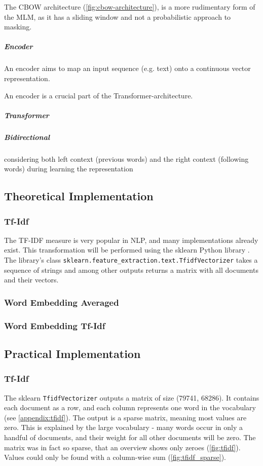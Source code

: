              The \ac{CBOW} architecture (\ref{fig:cbow-architecture}), is a more rudimentary form of the \ac{MLM}, as it has a sliding window and not a probabilistic approach to masking.
            
             \subparagraph{Encoder} An encoder aims to map an input sequence (e.g. text) onto a continuous vector representation.
             
             An encoder is a crucial part of the Transformer-architecture.
            
            \subparagraph{Transformer}
            \cite{transformersAttention}
            
            
            
            
           
            
            \subparagraph{Bidirectional}
            
            considering both left context (previous words) and the right context (following words) during learning the representation
            \subsection{Theoretical Implementation}
            \subsubsection{Tf-Idf}
            The \ac{TF-IDF} measure is very popular in \ac{NLP}, and many implementations already exist. This transformation will be performed using the \ac{sklearn} Python library \cite{sklearn}. The library's class \lstinline|sklearn.feature_extraction.text.TfidfVectorizer| takes a sequence of strings and among other outputs returns a matrix with all documents and their vectors.
            
            \subsubsection{Word Embedding Averaged}
            \subsubsection{Word Embedding Tf-Idf}
            \subsection{Practical Implementation}
            \subsubsection{Tf-Idf}
            The \ac{sklearn} \lstinline|TfidfVectorizer| \cite{sklearn} outputs a matrix of size (79741, 68286). It contains each document as a row, and each column represents one word in the vocabulary (see \ref{appendix:tfidf}). The output is a sparse matrix, meaning most values are zero. This is explained by the large vocabulary - many words occur in only a handful of documents, and their weight for all other documents will be zero.
            The matrix was in fact so sparse, that an overview shows only zeroes (\ref{fig:tfidf}). Values could only be found with a column-wise sum (\ref{fig:tfidf_sparse}).
            
